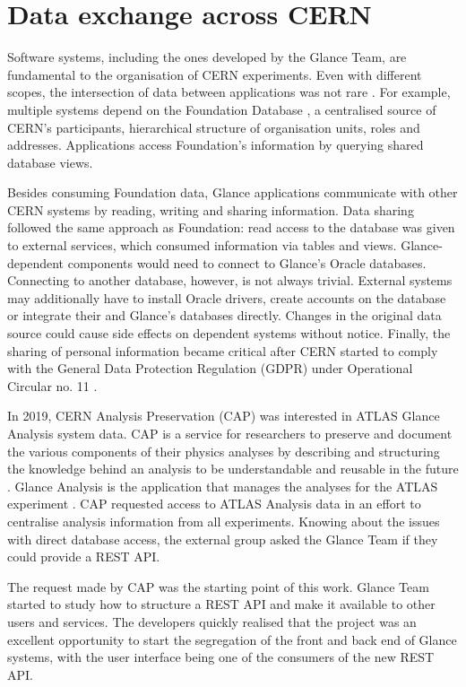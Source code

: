 \section{Data exchange across CERN}

Software systems, including the ones developed by the Glance Team, are fundamental to the organisation of CERN experiments. Even with different scopes, the intersection of data between applications was not rare \cite{de-jesus-tcc}. For example, multiple systems depend on the Foundation Database \cite{foundation-website}, a centralised source of CERN's participants, hierarchical structure of organisation units, roles and addresses. Applications access Foundation's information by querying shared database views.

Besides consuming Foundation data, Glance applications communicate with other CERN systems by reading, writing and sharing information. Data sharing followed the same approach as Foundation: read access to the database was given to external services, which consumed information via tables and views. Glance-dependent components would need to connect to Glance's Oracle databases. Connecting to another database, however, is not always trivial. External systems may additionally have to install Oracle drivers, create accounts on the database or integrate their and Glance's databases directly. Changes in the original data source could cause side effects on dependent systems without notice. Finally, the sharing of personal information became critical after CERN started to comply with the General Data Protection Regulation (GDPR) \cite{gdpr} under Operational Circular no. 11 \cite{cern-operational-circular-11}.

In 2019, CERN Analysis Preservation (CAP) was interested in ATLAS Glance Analysis system data. CAP is a service for researchers to preserve and document the various components of their physics analyses by describing and structuring the knowledge behind an analysis to be understandable and reusable in the future \cite{cap-website}. Glance Analysis is the application that manages the analyses for the ATLAS experiment \cite{atlas-glance-analysis} \cite{pinhao-tcc}. CAP requested access to ATLAS Analysis data in an effort to centralise analysis information from all experiments. Knowing about the issues with direct database access, the external group asked the Glance Team if they could provide a REST API.

The request made by CAP was the starting point of this work. Glance Team started to study how to structure a REST API and make it available to other users and services. The developers quickly realised that the project was an excellent opportunity to start the segregation of the front and back end of Glance systems, with the user interface being one of the consumers of the new REST API.

